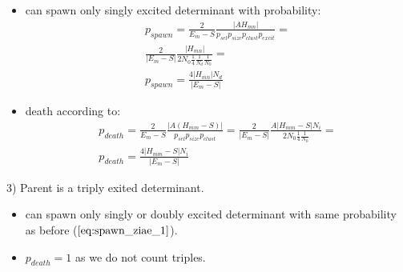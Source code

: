 \documentclass[twoside,english]{uiofysmaster}
\theoremstyle{definition}
\begin{document}
\begin{enumerate}
\begin{itemize}
\item can spawn only singly excited determinant with probability:
\begin{align}\label{eq:spawn_ziae_1}
p_{spawn} = \frac{2}{E_m - S} \frac{|AH_{mn}|}{ p_{sel}  p_{size} p_{clust} p_{excit} }=\\
\frac{2}{|E_m  - S|} \frac{|H_{mn}|}{2N_0 \frac{1}{4} \frac{1}{N_d} \frac{1}{N_0}} =\\
p_{spawn} =\frac{4|H_{mn}|N_d}{|E_m  - S|}
\end{align}
\item death according to:
\begin{align}
p_{death} = \frac{2}{E_m - S} \frac{|A(H_{mm}-S)|}{ p_{sel}  p_{size} p_{clust} }= \frac{2}{|E_m - S|} \frac{A|H_{mm}-S|N_i}{ 2N_0 \frac{1}{4} \frac{1}{N_0}}=\\
p_{death} = \frac{4|H_{mm}-S|N_i}{|E_m - S|} 
\end{align}
\end{itemize}
3) Parent is a triply exited determinant.
\begin{itemize}
\item can spawn only singly or doubly excited determinant with same probability as before ($\ref{eq:spawn_ziae_1}$).
\item $p_{death} = 1$ as we do not count triples.
\end{itemize}


\end{enumerate}
\end{document}
